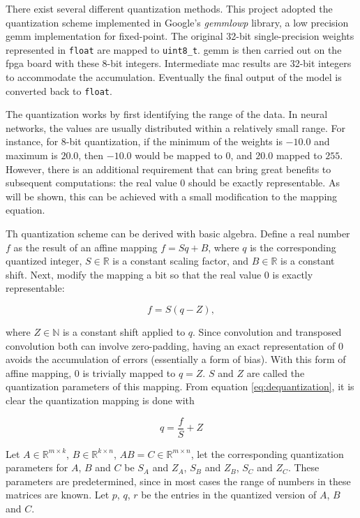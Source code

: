There exist several different quantization methods. This project adopted the quantization scheme
implemented in Google's \textit{gemmlowp} library, a low precision \gls{gemm} implementation for fixed-point.
The original 32-bit single-precision weights represented in \texttt{float} are mapped to 
\texttt{uint8_t}. \gls{gemm} is then
carried out on the \gls{fpga} board with these 8-bit integers. Intermediate \gls{mac} results are 32-bit
integers to accommodate the accumulation. Eventually the final output of the model is converted back to
\texttt{float}.

The quantization works by first identifying the range of the data. In neural networks, the values are usually
distributed within a relatively small range. For instance, for 8-bit quantization, if the minimum of the
weights is $-10.0$ and maximum is $20.0$, then $-10.0$ would be mapped to $0$, and $20.0$ mapped to $255$.
However, there is an additional requirement that can bring great benefits to subsequent computations:
the real value $0$ should be exactly representable. As will be shown, this can be achieved with a small
modification to the mapping equation.

Th quantization scheme can be derived with basic algebra. Define a real number $f$ as the result of an affine
mapping $f = S q + B$, where $q$ is the corresponding quantized integer, $S \in \mathbb{R}$ is a constant
scaling factor, and $B \in \mathbb{R}$ is a constant shift. Next, modify the mapping a bit so that the
real value $0$ is exactly representable:

\begin{equation} \label{eq:dequantization}
  f = S(q - Z),
\end{equation}

where $Z \in \mathbb{N}$ is a constant shift applied to $q$. Since convolution and transposed convolution
both can involve zero-padding, having an exact representation of $0$ avoids the accumulation of errors
(essentially a form of bias). With this form of affine mapping, $0$ is trivially mapped to $q = Z$. $S$ and
$Z$ are called the quantization parameters of this mapping. From equation \ref{eq:dequantization},
it is clear the quantization mapping is done with

\begin{equation} \label{eq:quantization}
  q = \frac{f}{S} + Z
\end{equation}

Let $A \in \mathbb{R}^{m \times k}$, $B \in \mathbb{R}^{k \times n}$, $A B = C \in \mathbb{R}^{m \times n}$,
let the corresponding quantization parameters for $A$, $B$ and $C$ be $S_A$ and $Z_A$, $S_B$ and $Z_B$,
$S_C$ and $Z_C$. These parameters are predetermined, since in most cases the range of numbers in these matrices
are known. Let $p$, $q$, $r$ be the entries in the quantized version of $A$, $B$ and $C$. 

